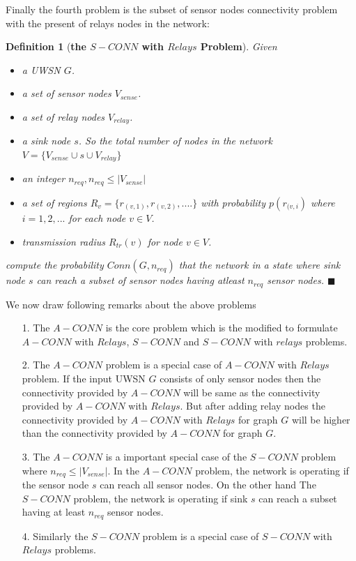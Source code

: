 \documentclass[12pt]{article}
\newtheorem*{defi}{Definition}
\begin{document}
Finally the fourth problem is the subset of sensor nodes connectivity problem with the present of relays nodes in the network:
\begin{defi}[\textbf{the $S-CONN$ with $Relays$ Problem}]
\normalfont
Given
\begin{itemize}[noitemsep]
\item a UWSN $G$.
\item a set of sensor nodes $V_{sense}$.
\item a set of relay nodes $V_{relay}$.
\item a sink node $s$. So the total number of nodes in the network $V={\{V_{sense}\cup s\cup V_{relay}\}}$
\item an integer $n_{req},n_{req}\leq |V_{sense}|$
\item  a set of regions  $R_v=\{r_{(v,1)},r_{(v,2)},....\}$  with probability $p(r_{(v,i})$ where $i=1,2,...$ for each node $v\in V$.
\item transmission radius $R_{tr}(v)$  for node $v\in V$.
\end{itemize} compute the probability $Conn(G,n_{req})$ that the network in a state where sink node $s$ can reach a subset of sensor nodes having atleast $n_{req}$ sensor nodes. $\blacksquare$
\end{defi}
We now draw following remarks about the above problems
\begin{itemize}
\item[1.] The $A-CONN$ is the core problem which is the modified to formulate $A-CONN$ with $Relays$, $S-CONN$ and  $S-CONN$ with $relays$ problems.
\item[2.] The $A-CONN$ problem is a special case of $A-CONN$ with $Relays$ problem. If the input UWSN $G$ consists of only sensor nodes then the connectivity provided by $A-CONN$ will be same as the connectivity provided by $A-CONN$ with $Relays$. But after adding relay nodes the connectivity provided by $A-CONN$ with $Relays$ for graph $G$ will be higher than the connectivity provided by $A-CONN$ for graph $G$.
\item[3.] The $A-CONN$ is a important special case of the $S-CONN$ problem where $n_{req} \leq |V_{sense}|$. In the $A-CONN$ problem, the network is operating if the sensor node $s$ can reach all sensor nodes. On the other hand The $S-CONN$ problem, the network is operating if sink $s$ can reach a subset having at least $n_{req}$ sensor nodes.
\item[4.] Similarly the $S-CONN$ problem is a special case of $S-CONN$  with $Relays$ problems.
\end{itemize}
\end{document}
